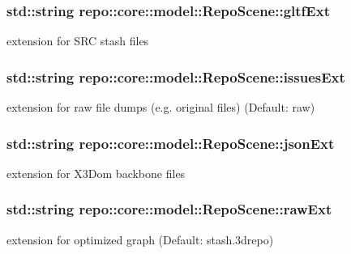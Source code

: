 \subsubsection[{gltf\+Ext}]{\setlength{\rightskip}{0pt plus 5cm}std\+::string repo\+::core\+::model\+::\+Repo\+Scene\+::gltf\+Ext\hspace{0.3cm}{\ttfamily [protected]}}\label{classrepo_1_1core_1_1model_1_1_repo_scene_a0de6d5d1c514db0e859b150feb312337}
extension for S\+R\+C stash files \hypertarget{classrepo_1_1core_1_1model_1_1_repo_scene_ade467377ddb29a8b7ea7347ed81ad0a4}{}
\subsubsection[{issues\+Ext}]{\setlength{\rightskip}{0pt plus 5cm}std\+::string repo\+::core\+::model\+::\+Repo\+Scene\+::issues\+Ext\hspace{0.3cm}{\ttfamily [protected]}}\label{classrepo_1_1core_1_1model_1_1_repo_scene_ade467377ddb29a8b7ea7347ed81ad0a4}
extension for raw file dumps (e.\+g. original files) (Default\+: raw) \hypertarget{classrepo_1_1core_1_1model_1_1_repo_scene_a979903ee1680863f4c67cf524bbc6e9f}{}
\subsubsection[{json\+Ext}]{\setlength{\rightskip}{0pt plus 5cm}std\+::string repo\+::core\+::model\+::\+Repo\+Scene\+::json\+Ext\hspace{0.3cm}{\ttfamily [protected]}}\label{classrepo_1_1core_1_1model_1_1_repo_scene_a979903ee1680863f4c67cf524bbc6e9f}
extension for X3\+Dom backbone files \hypertarget{classrepo_1_1core_1_1model_1_1_repo_scene_a19be566f3815da34dea4447f4d5b2dba}{}
\subsubsection[{raw\+Ext}]{\setlength{\rightskip}{0pt plus 5cm}std\+::string repo\+::core\+::model\+::\+Repo\+Scene\+::raw\+Ext\hspace{0.3cm}{\ttfamily [protected]}}\label{classrepo_1_1core_1_1model_1_1_repo_scene_a19be566f3815da34dea4447f4d5b2dba}
extension for optimized graph (Default\+: stash.\+3drepo) \hypertarget{classrepo_1_1core_1_1model_1_1_repo_scene_a72ff48bdd737480c5dd98edb4a39a557}{}
